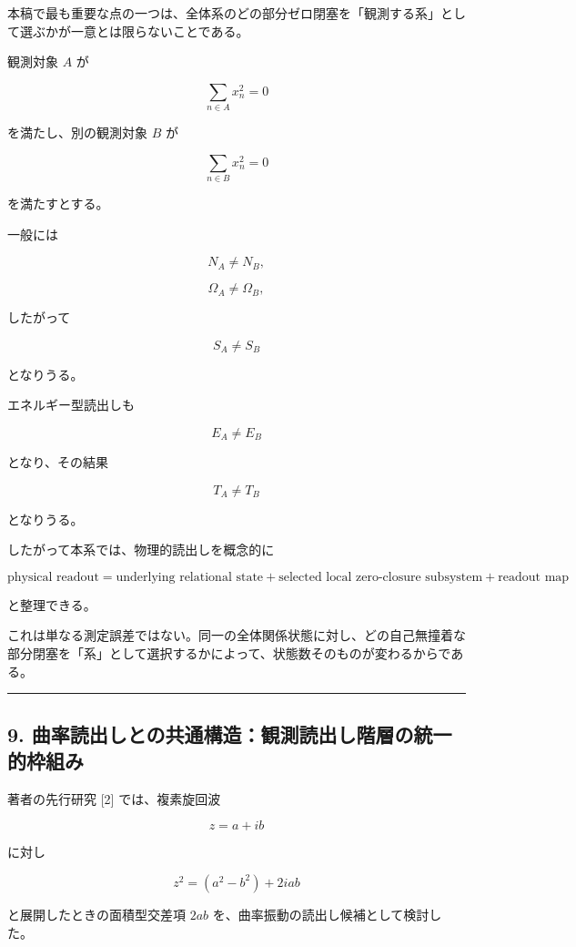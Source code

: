 \documentclass[
  a4paper,
]{ltjsarticle}
\begin{document}
本稿で最も重要な点の一つは、全体系のどの部分ゼロ閉塞を「観測する系」として選ぶかが一意とは限らないことである。

観測対象 \(A\) が

\[
\sum_{n\in A}x_n^2=0
\]

を満たし、別の観測対象 \(B\) が

\[
\sum_{n\in B}x_n^2=0
\]

を満たすとする。

一般には

\[
N_A\neq N_B,
\]

\[
\Omega_A\neq\Omega_B,
\]

したがって

\[
S_A\neq S_B
\]

となりうる。

エネルギー型読出しも

\[
E_A\neq E_B
\]

となり、その結果

\[
T_A\neq T_B
\]

となりうる。

したがって本系では、物理的読出しを概念的に

\[
\boxed{
\text{physical readout}
=
\text{underlying relational state}
+
\text{selected local zero-closure subsystem}
+
\text{readout map}
}
\tag{18}
\]

と整理できる。

これは単なる測定誤差ではない。同一の全体関係状態に対し、どの自己無撞着な部分閉塞を「系」として選択するかによって、状態数そのものが変わるからである。

\begin{center}\rule{0.5\linewidth}{0.5pt}\end{center}

\subsection{9.
曲率読出しとの共通構造：観測読出し階層の統一的枠組み}\label{ux66f2ux7387ux8aadux51faux3057ux3068ux306eux5171ux901aux69cbux9020ux89b3ux6e2cux8aadux51faux3057ux968eux5c64ux306eux7d71ux4e00ux7684ux67a0ux7d44ux307f}

著者の先行研究 {[}2{]} では、複素旋回波

\[
z=a+ib
\]

に対し

\[
z^2
=
(a^2-b^2)+2iab
\]

と展開したときの面積型交差項 \(2ab\)
を、曲率振動の読出し候補として検討した。
\end{document}
